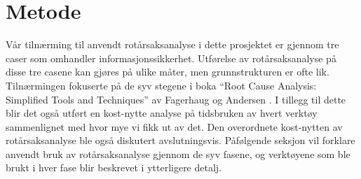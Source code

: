 \chapter{Metode}
\label{kap:metode}
Vår tilnærming til anvendt rotårsaksanalyse i dette prosjektet er gjennom tre caser som omhandler informasjonssikkerhet. Utførelse av rotårsaksanalyse på disse tre casene kan gjøres på ulike måter, men grunnstrukturen er ofte lik. Tilnærmingen fokuserte på de syv stegene i boka ``Root Cause Analysis: Simplified Tools and Techniques'' av Fagerhaug og Andersen \cite{RCA}. I tillegg til dette blir det også utført en kost-nytte analyse på tidsbruken av hvert verktøy sammenlignet med hvor mye vi fikk ut av det. Den overordnete kost-nytten av rotårsaksanalyse ble også diskutert avslutningsvis. Påfølgende seksjon vil forklare anvendt bruk av rotårsaksanalyse gjennom de syv fasene, og verktøyene som ble brukt i hver fase blir beskrevet i ytterligere detalj. 